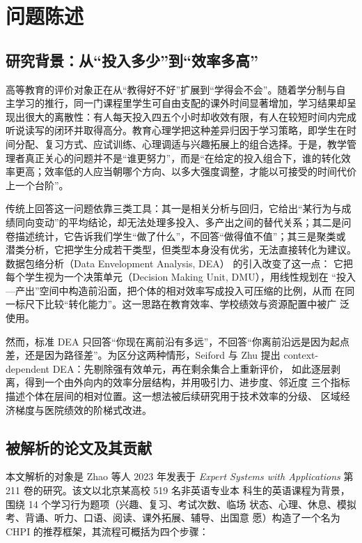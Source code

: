\section{问题陈述}

\subsection{研究背景：从“投入多少”到“效率多高”}

高等教育的评价对象正在从“教得好不好”扩展到“学得会不会”。随着学分制与自
主学习的推行，同一门课程里学生可自由支配的课外时间显著增加，学习结果却呈
现出很大的离散性：有人每天投入四五个小时却收效有限，有人在较短时间内完成
听说读写的闭环并取得高分。教育心理学把这种差异归因于学习策略，即学生在时
间分配、复习方式、应试训练、心理调适与兴趣拓展上的组合选择。于是，教学管
理者真正关心的问题并不是“谁更努力”，而是“在给定的投入组合下，谁的转化效
率更高；效率低的人应当朝哪个方向、以多大强度调整，才能以可接受的时间代价
上一个台阶”。

传统上回答这一问题依靠三类工具：其一是相关分析与回归，它给出“某行为与成
绩同向变动”的平均结论，却无法处理多投入、多产出之间的替代关系；其二是问
卷描述统计，它告诉我们学生“做了什么”，不回答“做得值不值”；其三是聚类或
潜类分析，它把学生分成若干类型，但类型本身没有优劣，无法直接转化为建议。
数据包络分析（Data Envelopment Analysis, DEA） 的引入改变了这一点：
它把每个学生视为一个决策单元（Decision Making Unit, DMU），用线性规划在
“投入—产出”空间中构造前沿面，把个体的相对效率写成投入可压缩的比例，从而
在同一标尺下比较“转化能力”。这一思路在教育效率、学校绩效与资源配置中被广
泛使用。

然而，标准 DEA 只回答“你现在离前沿有多远”，不回答“你离前沿远是因为起点
差，还是因为路径差”。为区分这两种情形，Seiford 与 Zhu 提出
context-dependent DEA：先剔除强有效单元，再在剩余集合上重新评价，
如此逐层剥离，得到一个由外向内的效率分层结构，并用吸引力、进步度、邻近度
三个指标描述个体在层间的相对位置。这一想法被后续研究用于技术效率的分级、
区域经济梯度与医院绩效的阶梯式改进。

\subsection{被解析的论文及其贡献}

本文解析的对象是 Zhao 等人 2023 年发表于 \textit{Expert Systems with
Applications} 第 211 卷的研究。该文以北京某高校 519 名非英语专业本
科生的英语课程为背景，围绕 14 个学习行为题项（兴趣、复习、考试次数、临场
状态、心理、休息、模拟考、背诵、听力、口语、阅读、课外拓展、辅导、出国意
愿）构造了一个名为 CHPI 的推荐框架，其流程可概括为四个步骤：

